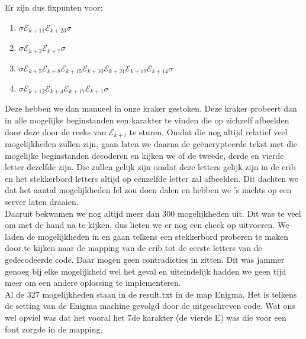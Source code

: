 \documentclass[fleqn]{article}
\begin{document}
	Er zijn dus fixpunten voor:
	\begin{enumerate}
		\item $\sigma \mathcal{E}_{k+11} \mathcal{E}_{k+23} \sigma$
		\item $\sigma \mathcal{E}_{k+2} \mathcal{E}_{k+7} \sigma$
		\item $\sigma \mathcal{E}_{k+5} \mathcal{E}_{k+8} \mathcal{E}_{k+15} \mathcal{E}_{k+10} \mathcal{E}_{k+21} \mathcal{E}_{k+19} \mathcal{E}_{k+14}\sigma$
		\item $\sigma \mathcal{E}_{k+12} \mathcal{E}_{k+4} \mathcal{E}_{k+17} \mathcal{E}_{k+1} \sigma$
	\end{enumerate}

	Deze hebben we dan manueel in onze kraker gestoken. Deze kraker probeert dan in alle mogelijke beginstanden een karakter te vinden die op zichzelf afbeelden door deze door de reeks van $\mathcal{E}_{k+i}$ te sturen. Omdat die nog altijd relatief veel mogelijkheden zullen zijn, gaan laten we daarna de ge\"{e}ncrypteerde tekst met die mogelijke beginstanden decoderen en kijken we of de tweede, derde en vierde letter dezelfde zijn. Die zullen gelijk zijn omdat deze letters gelijk zijn in de crib en het stekkerbord letters altijd op eenzelfde letter zal afbeelden. Dit dachten we dat het aantal mogelijkheden fel zou doen dalen en hebben we 's nachts op een server laten draaien.\\
	Daaruit bekwamen we nog altijd meer dan 300 mogelijkheden uit. Dit was te veel om met de hand na te kijken, dus lieten we er nog een check op uitvoeren.
	We laden de mogelijkheden in en gaan telkens een stekkerbord proberen te maken door te kijken naar de mapping van de crib tot de eerste letters van de gedecodeerde code. Daar mogen geen contradicties in zitten. Dit was jammer genoeg bij elke mogelijkheid wel het geval en uiteindelijk hadden we geen tijd meer om een andere oplossing te implementeren.
	\\
	Al de 327 mogelijkheden staan in de result.txt in de map Enigma. Het is telkens de setting van de Enigma machine gevolgd door de uitgeschreven code. Wat ons wel opviel was dat het vooral het 7de karakter (de vierde E) was die voor een fout zorgde in de mapping.
	
	
\end{document}
